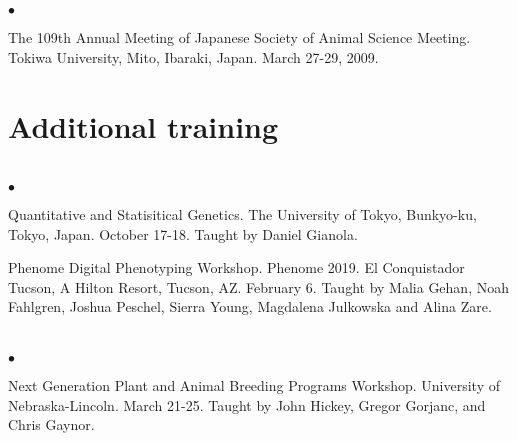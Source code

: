 \documentclass[margin,line,10pt]{res}
\newenvironment{list2}{
  \begin{list}{$\bullet$}{%
      \setlength{\itemsep}{0in}
      \setlength{\parsep}{0in} \setlength{\parskip}{0in}
      \setlength{\topsep}{0in} \setlength{\partopsep}{0in} 
      \setlength{\leftmargin}{0.2in}}}{\end{list}}
\begin{document}
\begin{resume}
\section{}
\begin{list2}
\item  The 109th Annual Meeting of Japanese Society of Animal Science Meeting. Tokiwa University, Mito, Ibaraki, Japan. March 27-29, 2009. 

\end{list2}













\vspace{0.5cm}
\section{ \sc Additional training}
\vspace{1cm}

\section{}
\begin{list2}

\item Quantitative and Statisitical Genetics. The University of Tokyo, Bunkyo-ku, Tokyo, Japan. October 17-18. Taught by Daniel Gianola.

  \vspace{0.5cm}
  
\item Phenome Digital Phenotyping Workshop. Phenome 2019. El Conquistador Tucson, A Hilton Resort, Tucson, AZ. February 6. Taught by Malia Gehan, Noah Fahlgren, Joshua Peschel, Sierra Young, Magdalena Julkowska and Alina Zare.
\end{list2}  


\section{}
\begin{list2}
\item Next Generation Plant and Animal Breeding Programs Workshop. University of Nebraska-Lincoln. March 21-25.  Taught by John Hickey, Gregor Gorjanc, and Chris Gaynor.
\end{list2}  



\end{resume}
\end{document}
